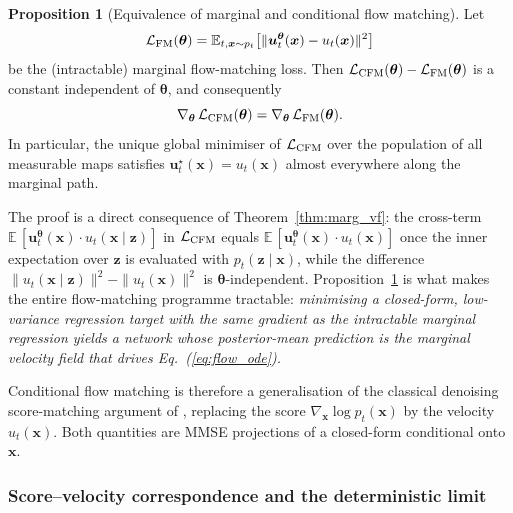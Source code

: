 \documentclass[11pt]{article}
\newcommand{\EE}{\mathbb{E}}
\DeclareRobustCommand{\uvec}{\bm{u}}
\DeclareRobustCommand{\xvec}{\bm{x}}
\DeclareRobustCommand{\zvec}{\bm{z}}
\DeclareRobustCommand{\thetavec}{\bm{\theta}}
\theoremstyle{definition}
\newtheorem{proposition}[definition]{Proposition}
\begin{document}
\begin{proposition}[Equivalence of marginal and conditional flow matching]
\label{prop:fm_equiv}
Let
\begin{equation}
  \mathcal L_{\rm FM}(\thetavec) = \EE_{t,\xvec\sim p_t}\bigl[\|\uvec_t^{\thetavec}(\xvec)-u_t(\xvec)\|^2\bigr]
\end{equation}
be the (intractable) marginal flow-matching loss. Then $\mathcal L_{\rm CFM}(\thetavec) - \mathcal L_{\rm FM}(\thetavec)$ is a constant independent of $\thetavec$, and consequently
\[
  \nabla_{\thetavec}\,\mathcal L_{\rm CFM}(\thetavec)
  = \nabla_{\thetavec}\,\mathcal L_{\rm FM}(\thetavec).
\]
In particular, the unique global minimiser of $\mathcal L_{\rm CFM}$ over the population of all measurable maps satisfies $\uvec^\star_t(\xvec) = u_t(\xvec)$ almost everywhere along the marginal path.
\end{proposition}

The proof is a direct consequence of Theorem~\ref{thm:marg_vf}: the cross-term $\EE\,[\uvec_t^{\thetavec}(\xvec)\!\cdot\!u_t(\xvec\mid\zvec)]$ in $\mathcal L_{\rm CFM}$ equals $\EE\,[\uvec_t^{\thetavec}(\xvec)\!\cdot\!u_t(\xvec)]$ once the inner expectation over $\zvec$ is evaluated with $p_t(\zvec\mid\xvec)$, while the difference $\|u_t(\xvec\mid\zvec)\|^2 - \|u_t(\xvec)\|^2$ is $\thetavec$-independent. Proposition~\ref{prop:fm_equiv} is what makes the entire flow-matching programme tractable: \emph{minimising a closed-form, low-variance regression target with the same gradient as the intractable marginal regression yields a network whose posterior-mean prediction is the marginal velocity field that drives Eq.~(\ref{eq:flow_ode}).}

Conditional flow matching is therefore a generalisation of the classical denoising score-matching argument of \cite{vincent2011dsm,song2020scorematching}, replacing the score $\nabla_{\xvec}\log p_t(\xvec)$ by the velocity $u_t(\xvec)$. Both quantities are MMSE projections of a closed-form conditional onto $\xvec$.

\subsubsection{Score--velocity correspondence and the deterministic limit}
\end{document}
